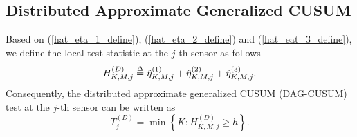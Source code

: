 \documentclass[11pt, draftclsnofoot, onecolumn]{IEEEtran}
\begin{document}
\subsection{Distributed Approximate Generalized CUSUM}

Based on (\ref{hat_eta_1_define}), (\ref{hat_eta_2_define}) and (\ref{hat_eat_3_define}), we define the local test statistic at the $j$-th sensor as follows
\begin{equation} \label{H_D_Define}
H_{K,M,j}^{\left( D \right)} \buildrel \Delta \over = \hat \eta _{K,M,j}^{(1)} + \hat \eta _{K,M,j}^{(2)} + \hat \eta _{K,M,j}^{(3)}.
\end{equation}
Consequently, the distributed approximate generalized CUSUM (DAG-CUSUM) test at the $j$-th sensor can be written as
\begin{equation} \label{DAGCUSUM}
T_j^{(D)} = \min \left\{ {K:H_{K,M,j}^{\left( D \right)} \ge {h}} \right\}.
\end{equation}
\end{document}
